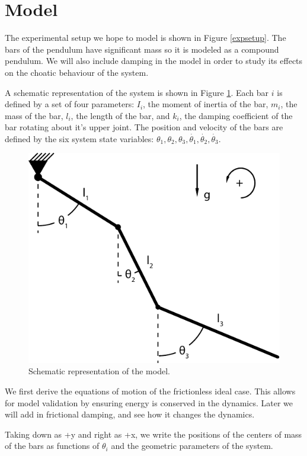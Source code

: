 \section{Model}
The experimental setup we hope to model is shown in Figure \ref{expsetup}. The bars of the pendulum have significant mass so it is modeled as a compound pendulum. We will also include damping in the model in order to study its effects on the choatic behaviour of the system.

A schematic representation of the system is shown in Figure \ref{model}. Each bar $i$ is defined by a set of four parameters: $I_i$, the moment of inertia of the bar, $m_i$, the mass of the bar, $l_i$, the length of the bar, and $k_i$, the damping coefficient of the bar rotating about it's upper joint. The position and velocity of the bars are defined by the six system state variables: $\theta _1, \theta _2, \theta _3, \dot{\theta _1}, \dot{\theta _2},\dot{\theta _3}$. 

\begin{figure}[H]
\centering
\includegraphics[scale=0.7]{Diagram.pdf}
\caption{Schematic representation of the model.}
\label{model}
\end{figure} 

We first derive the equations of motion of the frictionless ideal case. This allows for model validation by ensuring energy is conserved in the dynamics. Later we will add in frictional damping, and see how it changes the dynamics.

Taking down as +y and right as +x, we write the positions of the centers of mass of the bars as functions of $\theta _i$ and the geometric parameters of the system.

